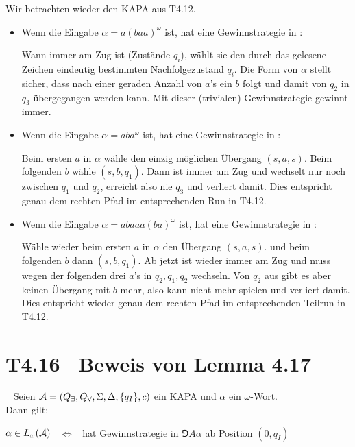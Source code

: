 \documentclass[fontsize=11pt, twoside=false, numbers=autoenddot]{scrbook}
\begin{document}
Wir betrachten wieder den KAPA \Amc aus T4.12.
%
\parI
\begin{itemize}
  \item
    Wenn die Eingabe $\alpha = a(baa)^\omega$ ist,
    hat \PlE eine Gewinnstrategie in :
    
    \parI
    Wann immer \PlE am Zug ist (Zustände $q_i$),
    wählt sie den durch das gelesene Zeichen eindeutig bestimmten Nachfolgezustand $q_i$.
    Die Form von $\alpha$ stellt sicher, dass nach einer geraden Anzahl von $a$'s
    ein $b$ folgt und damit von $q_2$ in $q_3$ übergegangen werden kann.
    Mit dieser (trivialen) Gewinnstrategie gewinnt \PlE immer.
    \parI
  \item
    Wenn die Eingabe $\alpha = aba^\omega$ ist,
    hat \PlA eine Gewinnstrategie in :
    
    \parI
    Beim ersten $a$ in $\alpha$ wähle den einzig möglichen Übergang $(s,a,s)$.
    Beim folgenden $b$ wähle $(s,b,q_1)$.
    Dann ist \PlE immer am Zug und wechselt nur noch zwischen $q_1$ und $q_2$,
    erreicht also nie $q_3$ und verliert damit.
    Dies entspricht genau dem rechten Pfad im entsprechenden Run in T4.12.
    \parI
  \item
    Wenn die Eingabe $\alpha = abaaa(ba)^\omega$ ist,
    hat \PlA eine Gewinnstrategie in :
    
    \parI
    Wähle wieder beim ersten $a$ in $\alpha$ den Übergang $(s,a,s)$.
    und beim folgenden $b$ dann $(s,b,q_1)$.
    Ab jetzt ist wieder \PlE immer am Zug und 
    muss wegen der folgenden drei $a$'s in $q_2,q_1,q_2$ wechseln.
    Von $q_2$ aus gibt es aber keinen Übergang mit $b$ mehr,
    also kann \PlE nicht mehr spielen und verliert damit.
    Dies entspricht wieder genau dem rechten Pfad im entsprechenden Teilrun in T4.12.
\end{itemize}

\section*{T4.16~ Beweis von Lemma 4.17}

~
Seien $\mathcal{A} = (Q_\exists,Q_\forall,\Sigma,\Delta,\{q_I\},c)$ ein KAPA
und $\alpha$ ein $\omega$-Wort. \\ %
Dann gilt:
%
\begin{center}
  $\alpha \in L_\omega(\mathcal{A})$ ~$\Leftrightarrow$~ \PlE hat Gewinnstrategie in $\Game{A}{\alpha}$ ab Position $(0,q_I)$
\end{center}
\end{document}
